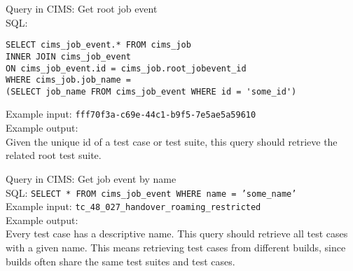 
\label{q:getrootts}
Query in CIMS: Get root job event \\
SQL:
\begin{verbatim}
SELECT cims_job_event.* FROM cims_job
INNER JOIN cims_job_event 
ON cims_job_event.id = cims_job.root_jobevent_id
WHERE cims_job.job_name =
(SELECT job_name FROM cims_job_event WHERE id = 'some_id')

\end{verbatim}
Example input: {\tt fff70f3a-c69e-44c1-b9f5-7e5ae5a59610 } \\
Example output: \\
Given the unique id of a test case or test suite, this query should retrieve the related root test suite.

\label{q:gettcbyname}
Query in CIMS: Get job event by name \\
SQL: {\tt SELECT * FROM cims\_job\_event WHERE name = 'some\_name' } \\
Example input: {\tt tc\_48\_027\_handover\_roaming\_restricted } \\
Example output: \\
Every test case has a descriptive name. This query should retrieve all test cases with a given name. This means retrieving test cases from different builds, since builds often share the same test suites and test cases.


